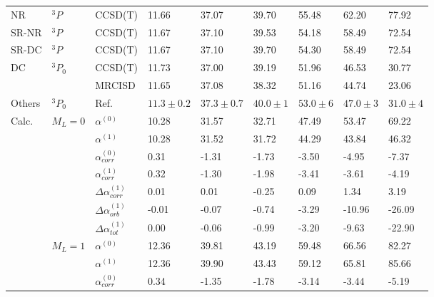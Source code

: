 \begin{longtable}{lllllllll}
\bottomrule
\endlastfoot
NR & $^3P$ & CCSD(T) &         11.66 &          37.07 &       39.70 &       55.48 &       62.20 &       77.92 \\
SR-NR & $^3P$ & CCSD(T) &         11.67 &          37.10 &       39.53 &       54.18 &       58.49 &       72.54 \\
SR-DC & $^3P$ & CCSD(T) &         11.67 &          37.10 &       39.70 &       54.30 &       58.49 &       72.54 \\
DC & $^3P_0$ & CCSD(T) &         11.73 &          37.00 &       39.19 &       51.96 &       46.53 &       30.77 \\
      &       & MRCISD &         11.65 &          37.08 &       38.32 &       51.16 &       44.74 &       23.06 \\
Others & $^3P_0$ & Ref. \cite{Schwerdtfeger2019} &  $11.3\pm0.2$ &  $37.3\pm 0.7$ &  $40.0\pm1$ &  $53.0\pm6$ &  $47.0\pm3$ &  $31.0\pm4$ \\
Calc. & $M_L=0$ & $\alpha^{(0)}$ &         10.28 &          31.57 &       32.71 &       47.49 &       53.47 &       69.22 \\
      &       & $\alpha^{(1)}$ &         10.28 &          31.52 &       31.72 &       44.29 &       43.84 &       46.32 \\
      &       & $\alpha_{corr}^{(0)}$ &          0.31 &          -1.31 &       -1.73 &       -3.50 &       -4.95 &       -7.37 \\
      &       & $\alpha_{corr}^{(1)}$ &          0.32 &          -1.30 &       -1.98 &       -3.41 &       -3.61 &       -4.19 \\
      &       & $\Delta \alpha_{corr}^{(\text{1})}$ &          0.01 &           0.01 &       -0.25 &        0.09 &        1.34 &        3.19 \\
      &       & $\Delta \alpha_{orb}^{(\text{1})}$ &         -0.01 &          -0.07 &       -0.74 &       -3.29 &      -10.96 &      -26.09 \\
      &       & $\Delta \alpha_{tot}^{(\text{1})}$ &          0.00 &          -0.06 &       -0.99 &       -3.20 &       -9.63 &      -22.90 \\
      & $M_L=1$ & $\alpha^{(0)}$ &         12.36 &          39.81 &       43.19 &       59.48 &       66.56 &       82.27 \\
      &       & $\alpha^{(1)}$ &         12.36 &          39.90 &       43.43 &       59.12 &       65.81 &       85.66 \\
      &       & $\alpha_{corr}^{(0)}$ &          0.34 &          -1.35 &       -1.78 &       -3.14 &       -3.44 &       -5.19 \\

\end{longtable}
